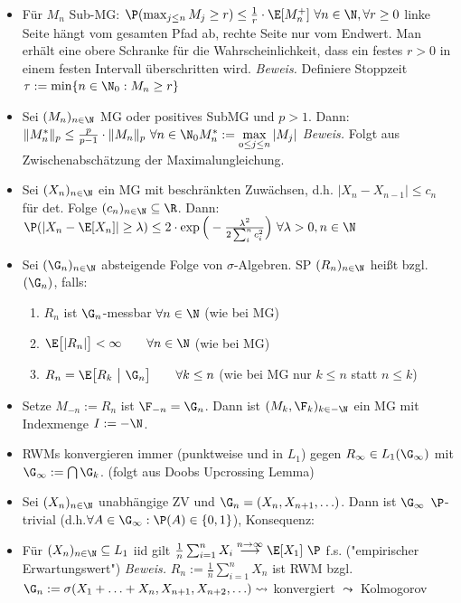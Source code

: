 	\begin{itemize}
		\item {} Für $M_n$ Sub-MG: $\P(\max_{j\leq n} M_j\geq r)\leq\frac{1}{r}\cdot\E[M_n^+]~\forall n\in\N,\forall r\geq0$
	linke Seite hängt vom gesamten Pfad ab, rechte Seite nur vom Endwert.
	Man erhält eine obere Schranke für die Wahrscheinlichkeit, dass ein festes $r>0$ in einem festen Intervall überschritten wird.
	\textit{Beweis.} Definiere Stoppzeit $\tau:=\min\lbrace n\in\N_0:M_n\geq r\rbrace$
		\item {} Sei $(M_n)_{n\in\N}$ MG oder positives SubMG und $p>1$. Dann:\\
		$\Vert M_n^\ast\Vert_p\leq\frac{p}{p-1}\cdot\Vert M_n\Vert_p~\forall n\in\N_0\mit M_n^\ast:=\max\limits_{0\leq j\leq n}|M_j|$
		\textit{Beweis.} Folgt aus Zwischenabschätzung der Maximalungleichung.
		\item {} Sei $(X_n)_{n\in\N}$ ein MG mit beschränkten Zuwächsen, d.h. $|X_n-X_{n-1}|\leq c_n$ für det. Folge $(c_n)_{n\in\N}\subseteq\R$. Dann:
		$\P(|X_n-\E[X_n]|\geq\lambda)\leq 2\cdot\exp\Big(-\frac{\lambda^2}{2\sum_i^n c_i^2}\Big)~\forall\lambda>0, n\in\N$
		\item Sei $(\G_n)_{n\in\N}$ absteigende Folge von $\sigma$-Algebren. SP $(R_n)_{n\in\N}$ heißt  bzgl. $(\G_n)$, falls:
		\begin{enumerate}
			\item $R_n$ ist $\G_n$-messbar $\forall n\in\N$ (wie bei MG)
			\item $\begin{aligned}
				\E\big[|R_n|\big]<\infty\qquad\forall n\in\N
			\end{aligned}$ (wie bei MG)
			\item $\begin{aligned}
				R_n=\E\big[R_k~\big|~\G_n\big]\qquad\forall k\leq n
			\end{aligned}$ (wie bei MG nur $k\leq n$ statt $n\leq k$)
		\end{enumerate}
		\item Setze $M_{-n}:=R_n$ ist $\F_{-n}=\G_n$. Dann ist $(M_k,\F_k)_{k\in-\N}$ ein MG mit Indexmenge $I:=-\N$.
		\item RWMs konvergieren immer (punktweise und in $L_1$) gegen $R_\infty\in L_1(\G_\infty)$ mit  $\G_\infty:=\bigcap\G_k$. (folgt aus Doobs Upcrossing Lemma)
		\item {} Sei $(X_n)_{n\in\N}$ unabhängige ZV und $\G_n=(X_n,X_{n+1},\ldots)$. Dann ist $\G_\infty$ $\P$-trivial (d.h.$\forall A\in\G_\infty:\P(A)\in\lbrace0,1\rbrace$), Konsequenz:
		\item {} Für $(X_n)_{n\in\N}\subseteq L_1$ iid gilt $\frac{1}{n}\sum_{i=1}^n X_i\overset{n\to\infty}{\longrightarrow}\E[X_1]~\P$ f.s. ("empirischer Erwartungswert")
		\textit{Beweis.} $R_n:=\frac{1}{n}\sum_{i=1}^n X_n$ ist RWM bzgl. $\G_n:=\sigma(X_1+\ldots+X_n,X_{n+1},X_{n+2},\ldots)\leadsto$ konvergiert $\leadsto$ Kolmogorov %
	\end{itemize}
		

